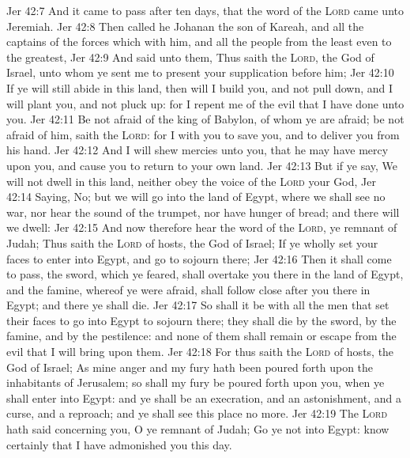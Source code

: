 \vs Jer 42:7 And it came to pass after ten days, that the word of the \textsc{Lord} came unto Jeremiah.
\vs Jer 42:8 Then called he Johanan the son of Kareah, and all the captains of the forces which  with him, and all the people from the least even to the greatest,
\vs Jer 42:9 And said unto them, Thus saith the \textsc{Lord}, the God of Israel, unto whom ye sent me to present your supplication before him;
\vs Jer 42:10 If ye will still abide in this land, then will I build you, and not pull  down, and I will plant you, and not pluck  up: for I repent me of the evil that I have done unto you.
\vs Jer 42:11 Be not afraid of the king of Babylon, of whom ye are afraid; be not afraid of him, saith the \textsc{Lord}: for I  with you to save you, and to deliver you from his hand.
\vs Jer 42:12 And I will shew mercies unto you, that he may have mercy upon you, and cause you to return to your own land.
\vs Jer 42:13 But if ye say, We will not dwell in this land, neither obey the voice of the \textsc{Lord} your God,
\vs Jer 42:14 Saying, No; but we will go into the land of Egypt, where we shall see no war, nor hear the sound of the trumpet, nor have hunger of bread; and there will we dwell:
\vs Jer 42:15 And now therefore hear the word of the \textsc{Lord}, ye remnant of Judah; Thus saith the \textsc{Lord} of hosts, the God of Israel; If ye wholly set your faces to enter into Egypt, and go to sojourn there;
\vs Jer 42:16 Then it shall come to pass,  the sword, which ye feared, shall overtake you there in the land of Egypt, and the famine, whereof ye were afraid, shall follow close after you there in Egypt; and there ye shall die.
\vs Jer 42:17 So shall it be with all the men that set their faces to go into Egypt to sojourn there; they shall die by the sword, by the famine, and by the pestilence: and none of them shall remain or escape from the evil that I will bring upon them.
\vs Jer 42:18 For thus saith the \textsc{Lord} of hosts, the God of Israel; As mine anger and my fury hath been poured forth upon the inhabitants of Jerusalem; so shall my fury be poured forth upon you, when ye shall enter into Egypt: and ye shall be an execration, and an astonishment, and a curse, and a reproach; and ye shall see this place no more.
\vs Jer 42:19 The \textsc{Lord} hath said concerning you, O ye remnant of Judah; Go ye not into Egypt: know certainly that I have admonished you this day.
